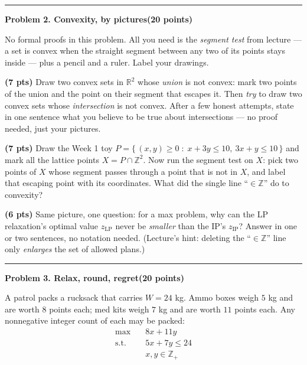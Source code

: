 \documentclass[10pt]{article}
\newcommand{\problem}[2]{%
  \par\bigskip
  {\color{ruleink}\rule{\textwidth}{1pt}}\par\nobreak\vspace{3pt}
  {\large\bfseries #2}\hfill{\normalsize\bfseries(#1 points)}\par\nobreak\vspace{4pt}}
\begin{document}
\problem{20}{Problem 2. Convexity, by pictures}

No formal proofs in this problem. All you need is the \emph{segment test} from
lecture --- a set is convex when the straight segment between any two of its points
stays inside --- plus a pencil and a ruler. Label your drawings.

\begin{parts}
\item \textbf{(7 pts)} Draw two convex sets in $\mathbb{R}^2$ whose \emph{union} is
  not convex: mark two points of the union and the point on their segment that
  escapes it. Then \emph{try} to draw two convex sets whose \emph{intersection} is
  not convex. After a few honest attempts, state in one sentence what you believe
  to be true about intersections --- no proof needed, just your pictures.
\item \textbf{(7 pts)} Draw the Week 1 toy
  $P = \{\, (x,y) \ge 0 \;:\; x + 3y \le 10, \ 3x + y \le 10 \,\}$ and mark all the
  lattice points $X = P \cap \mathbb{Z}^2$. Now run the segment test on $X$: pick
  two points of $X$ whose segment passes through a point that is not in $X$, and
  label that escaping point with its coordinates. What did the single line
  ``$\in \mathbb{Z}$'' do to convexity?
\item \textbf{(6 pts)} Same picture, one question: for a max problem, why can the
  LP relaxation's optimal value $z_{\mathrm{LP}}$ never be \emph{smaller} than the
  IP's $z_{\mathrm{IP}}$? Answer in one or two sentences, no notation needed.
  (Lecture's hint: deleting the ``$\in \mathbb{Z}$'' line only \emph{enlarges} the
  set of allowed plans.)
\end{parts}

\problem{20}{Problem 3. Relax, round, regret}

A patrol packs a rucksack that carries $W = 24$ kg. Ammo boxes weigh $5$ kg and are
worth $8$ points each; med kits weigh $7$ kg and are worth $11$ points each. Any
nonnegative integer count of each may be packed:
\[
\begin{aligned}
  \max\quad & 8x + 11y \\
  \text{s.t.}\quad & 5x + 7y \le 24 \\
                   & x, y \in \mathbb{Z}_{+}
\end{aligned}
\]
\end{document}
